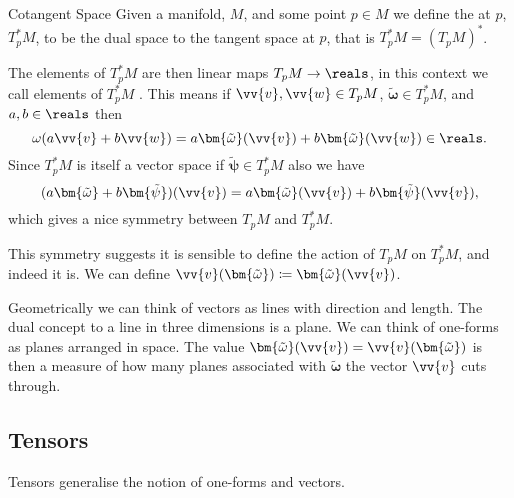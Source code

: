 \documentclass[fleqn]{NotesClass}
\newcommand*{\cv}[1]{\bm{\tilde{#1}}}
\begin{document}
    \begin{dfn}{Cotangent Space}{}
        Given a manifold, \(M\), and some point \(p \in M\) we define the  at \(p\), \(T_p^*M\), to be the dual space to the tangent space at \(p\), that is \(T_p^*M = (T_pM)^*\).
    \end{dfn}
    
    The elements of \(T_p^*M\) are then linear maps \(T_pM \to \reals\), in this context we call elements of \(T_p^*M\) .
    This means if \(\vv{v}, \vv{w} \in T_pM\), \(\cv{\omega} \in T_p^*M\), and \(a, b \in \reals\) then
    \begin{equation}
        \omega(a\vv{v} + b\vv{w}) = a\cv{\omega}(\vv{v}) + b\cv{\omega}(\vv{w}) \in \reals.
    \end{equation}
    Since \(T_p^*M\) is itself a vector space if \(\cv{\psi} \in T_p^*M\) also we have
    \begin{equation}
        (a\cv{\omega} + b\cv{\psi})(\vv{v}) = a\cv{\omega}(\vv{v}) + b\cv{\psi}(\vv{v}),
    \end{equation}
    which gives a nice symmetry between \(T_pM\) and \(T_p^*M\).
    
    This symmetry suggests it is sensible to define the action of \(T_pM\) on \(T_p^*M\), and indeed it is.
    We can define \(\vv{v}(\cv{\omega}) \coloneqq \cv{\omega}(\vv{v})\).
    
    Geometrically we can think of vectors as lines with direction and length.
    The dual concept to a line in three dimensions is a plane.
    We can think of one-forms as planes arranged in space.
    The value \(\cv{\omega}(\vv{v}) = \vv{v}(\cv{\omega})\) is then a measure of how many planes associated with \(\cv{\omega}\) the vector \(\vv{v}\) cuts through.
    
    \subsection{Tensors}
    Tensors generalise the notion of one-forms and vectors.
    
\end{document}
